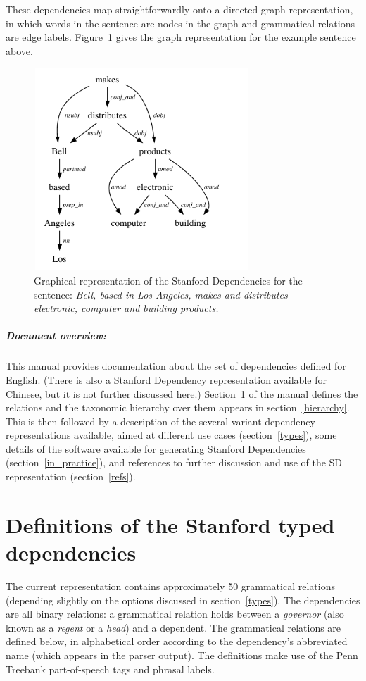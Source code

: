 \documentclass[11pt,letter]{article}
\begin{document}
These dependencies map straightforwardly onto a directed graph representation, in which words in the sentence are nodes in the graph and grammatical relations are edge labels. Figure~\ref{bell} gives the graph representation for the example sentence above.
\begin{figure}
\begin{center}
\includegraphics[width=3.2in, height=3.0in]{bell.pdf}
\end{center}
\vspace*{-0.6cm}
\caption{\label{bell} Graphical representation of the Stanford Dependencies for the sentence: \emph{Bell, based in Los Angeles, makes and distributes electronic, computer and building products.}}
\end{figure}

\subparagraph{Document overview:} This manual provides documentation about the set of dependencies defined
for English.  (There is also a Stanford Dependency representation
available for Chinese, but it is not further discussed here.)  Section~\ref{def}
of the manual defines the relations and the taxonomic hierarchy over
them appears in section~\ref{hierarchy}.  This is then followed by a description of the several variant
dependency representations available, aimed at different use cases
(section~\ref{types}), some details of the software available for
generating Stanford Dependencies (section~\ref{in_practice}), and
references to further discussion and use of the SD representation (section~\ref{refs}).


\section{Definitions of the Stanford typed dependencies}\label{def}

The current representation contains approximately 50 grammatical
relations (depending slightly on the options discussed in section~\ref{types}). The dependencies are all binary relations: a grammatical relation holds between a \emph{governor} (also known as a \emph{regent} or a \emph{head}) and a dependent. The grammatical relations are defined below, in alphabetical order according to the dependency's abbreviated name (which appears in the parser output). The definitions make use of the Penn Treebank part-of-speech tags and phrasal labels.
\end{document}
